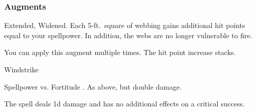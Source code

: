 \subsubsection{Augments}
 Extended, Widened.
Each 5-ft.\ square of webbing gains additional hit points equal to your spellpower.
In addition, the webs are no longer vulnerable to fire.
\par You can apply this augment multiple times.
The hit point increase stacks.
\begin{spellsection}{Windstrike}
\begin{spellheader}
\end{spellheader}
\begin{spellcontent}
\begin{spelltargetinginfo}
\end{spelltargetinginfo}
\begin{spelleffects}
\begin{spellattack}{Spellpower vs. Fortitude}
\spellsuccess {}.
\spellcritical As above, but double damage.
\end{spellattack}
\end{spelleffects}
\end{spellcontent}
\begin{spellfooter}
\miscastexplode
\end{spellfooter}
\begin{spellcantrip}
The spell deals \minus1d damage and has no additional effects on a critical success.
\end{spellcantrip}
\end{spellsection}
